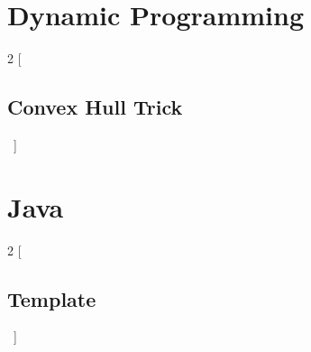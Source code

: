 \documentclass[letter]{amsart}
\newcommand{\includecpp}[3]{
  \begin{multicols}{2}
    [\subsection{#1}\ ]
    
  \end{multicols}
}
\newcommand{\includejava}[3]{
  \begin{multicols}{2}
    [\subsection{#1}\ ]
    
  \end{multicols}
}
\begin{document}
  

  \enlargethispage*{\baselineskip}
  \pagebreak

  \section{ Dynamic Programming }
     \includecpp {Convex Hull Trick}{./dynamic_programming}{convex_hull_trick.cpp}
    
  

  \enlargethispage*{\baselineskip}
  \pagebreak

  \section{ Java }
     \includejava {Template}{./java}{template.java}
    
  

  \enlargethispage*{\baselineskip}
  \pagebreak
\end{document}
